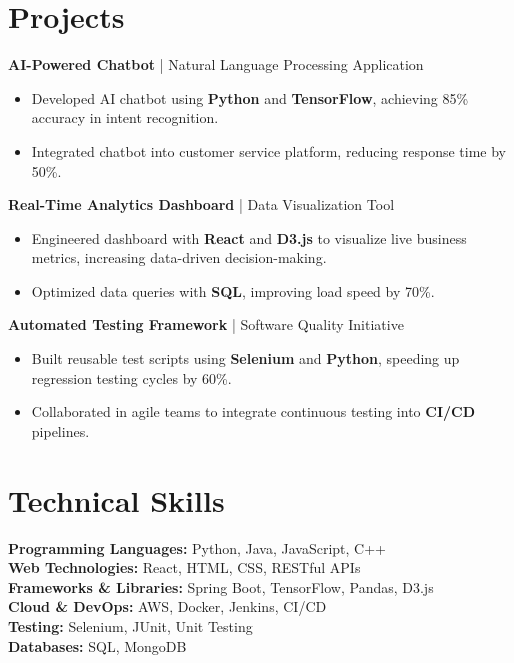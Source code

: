 \documentclass[a4paper,10pt]{article}
\begin{document}
\section*{Projects}

\textbf{AI-Powered Chatbot} | Natural Language Processing Application
\begin{itemize}[leftmargin=*, noitemsep]
    \item Developed AI chatbot using \textbf{Python} and \textbf{TensorFlow}, achieving 85\% accuracy in intent recognition.
    \item Integrated chatbot into customer service platform, reducing response time by 50\%.
\end{itemize}

\textbf{Real-Time Analytics Dashboard} | Data Visualization Tool
\begin{itemize}[leftmargin=*, noitemsep]
    \item Engineered dashboard with \textbf{React} and \textbf{D3.js} to visualize live business metrics, increasing data-driven decision-making.
    \item Optimized data queries with \textbf{SQL}, improving load speed by 70\%.
\end{itemize}

\textbf{Automated Testing Framework} | Software Quality Initiative
\begin{itemize}[leftmargin=*, noitemsep]
    \item Built reusable test scripts using \textbf{Selenium} and \textbf{Python}, speeding up regression testing cycles by 60\%.
    \item Collaborated in agile teams to integrate continuous testing into \textbf{CI/CD} pipelines.
\end{itemize}

\section*{Technical Skills}

\textbf{Programming Languages:} Python, Java, JavaScript, C++ \\
\textbf{Web Technologies:} React, HTML, CSS, RESTful APIs \\
\textbf{Frameworks \& Libraries:} Spring Boot, TensorFlow, Pandas, D3.js \\
\textbf{Cloud \& DevOps:} AWS, Docker, Jenkins, CI/CD \\
\textbf{Testing:} Selenium, JUnit, Unit Testing \\
\textbf{Databases:} SQL, MongoDB
\end{document}
